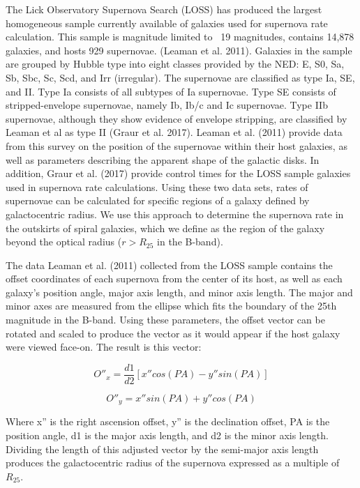 \documentclass[apj]{emulateapj}
\begin{document}
The Lick Observatory Supernova Search (LOSS) has produced the largest homogeneous sample currently available of galaxies used for supernova rate calculation. This sample is magnitude limited to ~19 magnitudes, contains 14,878 galaxies, and hosts 929 supernovae. (Leaman et al. 2011). Galaxies in the sample are grouped by Hubble type into eight classes provided by the NED: E, S0, Sa, Sb, Sbc, Sc, Scd, and Irr (irregular). The supernovae are classified as type Ia, SE, and II. Type Ia consists of all subtypes of Ia supernovae. Type SE consists of stripped-envelope supernovae, namely Ib, Ib/c and Ic supernovae. Type IIb supernovae, although they show evidence of envelope stripping, are classified by Leaman et al as type II (Graur et al. 2017). Leaman et al. (2011) provide data from this survey on the position of the supernovae within their host galaxies, as well as parameters describing the apparent shape of the galactic disks. In addition, Graur et al. (2017) provide control times for the LOSS sample galaxies used in supernova rate calculations. Using these two data sets, rates of supernovae can be calculated for specific regions of a galaxy defined by galactocentric radius. We use this approach to determine the supernova rate in the outskirts of spiral galaxies, which we define as the region of the galaxy beyond the optical radius ($r > R_{25}$ in the B-band).

The data Leaman et al. (2011) collected from the LOSS sample contains the offset coordinates of each supernova from the center of its host, as well as each galaxy's position angle, major axis length, and minor axis length. The major and minor axes are measured from the ellipse which fits the boundary of the 25th magnitude in the B-band. Using these parameters, the offset vector can be rotated and scaled to produce the vector as it would appear if the host galaxy were viewed face-on. The result is this vector:

\begin{equation}
O''_x=\frac{d1}{d2}[x''cos(PA)-y''sin(PA)]
\end{equation}

\begin{equation}
O''_y=x''sin(PA)+y''cos(PA)
\end{equation}

Where x'' is the right ascension offset, y'' is the declination offset, PA is the position angle, d1 is the major axis length, and d2 is the minor axis length. Dividing the length of this adjusted vector by the semi-major axis length produces the galactocentric radius of the supernova expressed as a multiple of $R_{25}$.
\end{document}
